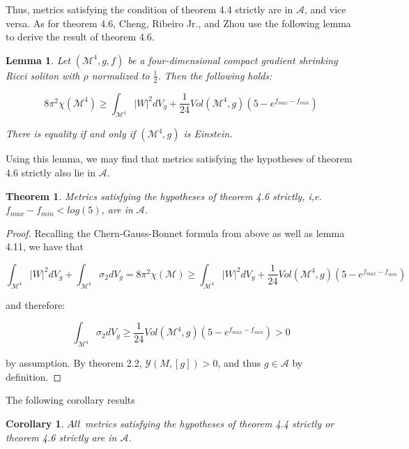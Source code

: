 \documentclass[openany, amssymb, psamsfonts]{amsart}
\newtheorem{thm}{Theorem}[section]
\newtheorem{cor}{Corollary}[section]
\newtheorem{lem}{Lemma}[section]
\theoremstyle{definition}
\numberwithin{equation}{section}
\begin{document}
Thus, metrics satisfying the condition of theorem 4.4 strictly are in $\mathcal{A}$, and vice versa. As for theorem 4.6, Cheng, Ribeiro Jr., and Zhou \cite{ernani} use the following lemma to derive the result of theorem 4.6.

\begin{lem}

Let $(\mathcal{M}^4, g, f)$ be a four-dimensional compact gradient shrinking Ricci soliton with $\rho$ normalized to $\frac{1}{2}$. Then the following holds:

$$8\pi^2 \chi(\mathcal{M}^4) \geq \int_{\mathcal{M}^4} |W|^2 dV_g + \frac{1}{24}Vol(\mathcal{M}^4, g)(5 - e^{f_{max} - f_{min}})$$

There is equality if and only if $(\mathcal{M}^4, g)$ is Einstein. 

\end{lem}

Using this lemma, we may find that metrics satisfying the hypotheses of theorem 4.6 strictly also lie in $\mathcal{A}$.

\begin{thm}

Metrics satisfying the hypotheses of theorem 4.6 strictly, i,e. $f_{max} - f_{min} < log(5)$, are in $\mathcal{A}$.

\end{thm}

\begin{proof}

Recalling the Chern-Gauss-Bonnet formula from above as well as lemma 4.11, we have that 


$$\int_{\mathcal{M}^4} |W|^2 dV_g + \int_{\mathcal{M}^4} \sigma_2 dV_g = 8\pi^2 \chi(\mathcal{M}) \geq \int_{\mathcal{M}^4} |W|^2 dV_g + \frac{1}{24}Vol(\mathcal{M}^4, g)(5 - e^{f_{max} - f_{min}})$$

and therefore:

$$\int_{\mathcal{M}^4} \sigma_2 dV_g \geq \frac{1}{24}Vol(\mathcal{M}^4, g)(5 - e^{f_{max} - f_{min}}) > 0$$

by assumption. By theorem 2.2, $\mathcal{Y}(M, [g]) > 0$, and thus $g \in \mathcal{A}$ by definition. 

\end{proof}

The following corollary results

\begin{cor}
$\emph{All}$ metrics satisfying the hypotheses of theorem 4.4 strictly or theorem 4.6 strictly are in $\mathcal{A}$. 
\end{cor}
\end{document}
